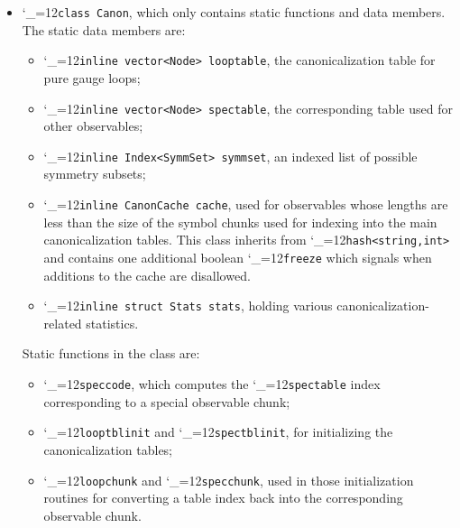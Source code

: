 \documentclass [12pt]{article}
\makeatletter
\renewcommand{\tt}{\begingroup\catcode`_=12\def\_{\string_}\tt@}
\newcommand{\tt@}[1]{\texttt{#1}\endgroup}
\makeatother
\begin{document}
\begin{itemize}
\item
    \tt{class Canon}, which only contains
    static functions and data members.
    The static data members are:
    \begin{itemize}
    \item
    \tt{inline vector<Node> looptable},
    the canonicalization table for pure gauge loops;
    \item
    \tt{inline vector<Node> spectable},
    the corresponding table used for other observables;
    \item
    \tt{inline Index<SymmSet> symmset},
    an indexed list of possible symmetry subsets;
    \item
    \tt{inline CanonCache cache},
    used for observables whose lengths are
    less than the size of the symbol chunks
    used for indexing into the main canonicalization tables.
    This class inherits from \tt{hash<string,int>}
    and contains one additional boolean \tt{freeze}
    which signals when additions to the cache are disallowed.
    \item
    \tt{inline struct Stats stats},
    holding various canonicalization-related statistics.
    \end{itemize}
    Static functions in the class are:
    \begin{itemize}
    \item
    \tt{speccode}, which computes the
    \tt{spectable} index corresponding to
    a special observable chunk;
    \item
    \tt{looptblinit} and \tt{spectblinit}, for initializing
    the canonicalization tables;
    \item
    \tt{loopchunk} and \tt{specchunk}, used in those
    initialization routines for converting a table index
    back into the corresponding observable chunk.
    \end{itemize}

\end{itemize}
\end{document}

